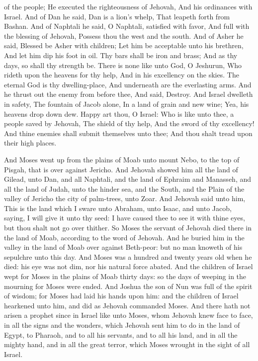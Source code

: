 of the people; He executed the righteousness of Jehovah, And his ordinances with Israel.  And of Dan he said, Dan is a lion’s whelp, That leapeth forth from Bashan.  And of Naphtali he said, O Naphtali, satisfied with favor, And full with the blessing of Jehovah, Possess thou the west and the south.  And of Asher he said, Blessed be Asher with children; Let him be acceptable unto his brethren, And let him dip his foot in oil.  Thy bars shall be iron and brass; And as thy days, so shall thy strength be.  There is none like unto God, O Jeshurun, Who rideth upon the heavens for thy help, And in his excellency on the skies.  The eternal God is thy dwelling-place, And underneath are the everlasting arms. And he thrust out the enemy from before thee, And said, Destroy.  And Israel dwelleth in safety, The fountain of Jacob alone, In a land of grain and new wine; Yea, his heavens drop down dew.  Happy art thou, O Israel: Who is like unto thee, a people saved by Jehovah, The shield of thy help, And the sword of thy excellency! And thine enemies shall submit themselves unto thee; And thou shalt tread upon their high places. 

And Moses went up from the plains of Moab unto mount Nebo, to the top of Pisgah, that is over against Jericho. And Jehovah showed him all the land of Gilead, unto Dan, and all Naphtali, and the land of Ephraim and Manasseh, and all the land of Judah, unto the hinder sea, and the South, and the Plain of the valley of Jericho the city of palm-trees, unto Zoar. And Jehovah said unto him, This is the land which I sware unto Abraham, unto Isaac, and unto Jacob, saying, I will give it unto thy seed: I have caused thee to see it with thine eyes, but thou shalt not go over thither. So Moses the servant of Jehovah died there in the land of Moab, according to the word of Jehovah. And he buried him in the valley in the land of Moab over against Beth-peor: but no man knoweth of his sepulchre unto this day. And Moses was a hundred and twenty years old when he died: his eye was not dim, nor his natural force abated. And the children of Israel wept for Moses in the plains of Moab thirty days: so the days of weeping in the mourning for Moses were ended.  And Joshua the son of Nun was full of the spirit of wisdom; for Moses had laid his hands upon him: and the children of Israel hearkened unto him, and did as Jehovah commanded Moses. And there hath not arisen a prophet since in Israel like unto Moses, whom Jehovah knew face to face, in all the signs and the wonders, which Jehovah sent him to do in the land of Egypt, to Pharaoh, and to all his servants, and to all his land, and in all the mighty hand, and in all the great terror, which Moses wrought in the sight of all Israel. 